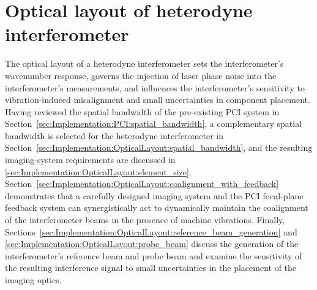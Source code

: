\section{Optical layout of heterodyne interferometer}
\label{sec:Implementation:OpticalLayout}
The optical layout of a heterodyne interferometer
sets the interferometer's wavenumber response,
governs the injection of laser phase noise
into the interferometer's measurements, and
influences the interferometer's sensitivity
to vibration-induced misalignment and
small uncertainties in component placement.
Having reviewed the spatial bandwidth
of the pre-existing PCI system in
Section~\ref{sec:Implementation:PCI:spatial_bandwidth},
a complementary spatial bandwidth is selected
for the heterodyne interferometer in
Section~\ref{sec:Implementation:OpticalLayout:spatial_bandwidth}, and
the resulting imaging-system requirements are discussed
in \ref{sec:Implementation:OpticalLayout:element_size}.
Section~\ref{sec:Implementation:OpticalLayout:coalignment_with_feedback}
demonstrates that a carefully designed imaging system and
the PCI focal-plane feedback system can synergistically act
to dynamically maintain the coalignment of the interferometer beams
in the presence of machine vibrations.
Finally,
Sections~\ref{sec:Implementation:OpticalLayout:reference_beam_generation}
and \ref{sec:Implementation:OpticalLayout:probe_beam}
discuss the generation
of the interferometer's reference beam and probe beam and
examine the sensitivity
of the resulting interference signal to small uncertainties
in the placement of the imaging optics.



